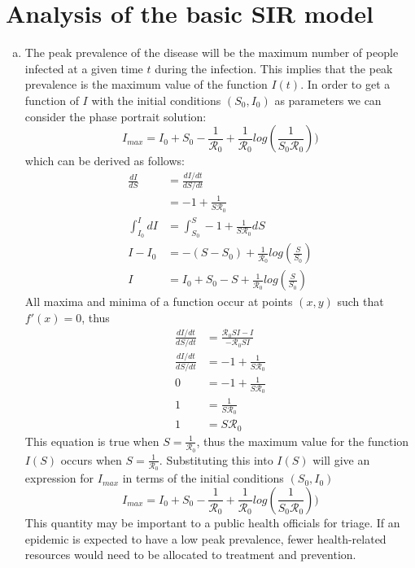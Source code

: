 \documentclass[12pt]{article}
\begin{document}
\section{Analysis of the basic SIR  model}
\begin{enumerate}[(a)]
\item %
The peak prevalence of the disease will be the maximum number of people infected at a given time $t$ during the infection.
This implies that the peak prevalence is the maximum value of the function $I(t)$.
In order to get a function of $I$ with the initial conditions $(S_0,I_0)$ as parameters we can consider the phase portrait solution:
$$ I_{max} = I_0 + S_0 - \frac{1}{\mathcal R_0} + \frac{1}{\mathcal R_0}log(\frac{1}{S_0\mathcal R_0}))$$
which can be derived as follows:
\begin{align*}
    \frac{dI}{dS}     &= \frac{dI/dt}{dS/dt}\\
                      &= -1 + \frac{1}{S\mathcal R_0}\\
    \int_{I_0}^{I} dI &= \int_{S_0}^{S} -1 + \frac{1}{S\mathcal R_0}dS\\
    I - I_0           &= -(S - S_0) + \frac{1}{\mathcal R_0}log(\frac{S}{S_0})\\
    I                 &= I_0 + S_0 - S + \frac{1}{\mathcal R_0}log(\frac{S}{S_0})
\end{align*}
All maxima and minima of a function occur at points $(x,y)$ such that $f'(x) = 0$, thus
\begin{align*}
    \frac{dI/dt}{dS/dt} &= \frac{{\mathcal R_0}SI - I}{-\mathcal R_0SI}\\
    \frac{dI/dt}{dS/dt} &= -1 + \frac{1}{S\mathcal R_0}\\
    0                   &= -1 + \frac{1}{S\mathcal R_0}\\
    1                   &= \frac{1}{S\mathcal R_0}\\
    1                   &= S{\mathcal R_0}
\end{align*}
This equation is true when $S = \frac{1}{\mathcal R_0}$, thus the maximum value for the function $I(S)$ occurs when $S = \frac{1}{\mathcal R_0}$.
Substituting this into $I(S)$ will give an expression for $I_{max}$ in terms of the initial conditions $(S_0,I_0)$
$$ I_{max} = I_0 + S_0 - \frac{1}{\mathcal R_0} + \frac{1}{\mathcal R_0}log(\frac{1}{S_0\mathcal R_0}))$$
This quantity may be important to a public health officials for triage. If an epidemic is expected to have a low peak prevalence, fewer health-related resources would need to be allocated to treatment and prevention.

\end{enumerate}
\end{document}
